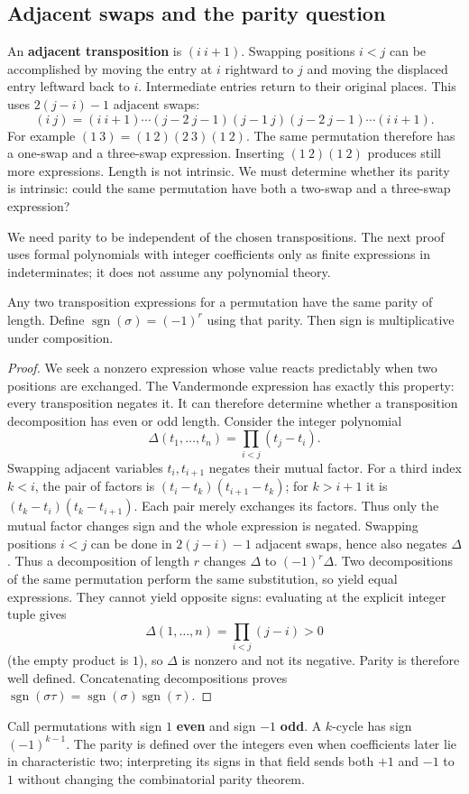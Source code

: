 \subsection{Adjacent swaps and the parity question}
An \textbf{adjacent transposition} is $(i\ i+1)$. Swapping positions
$i<j$ can be accomplished by moving the entry at $i$ rightward to $j$
and moving the displaced entry leftward back to $i$. Intermediate entries
return to their original places. This uses $2(j-i)-1$ adjacent swaps:
\[
(i\ j)=(i\ i+1)\cdots(j-2\ j-1)(j-1\ j)
(j-2\ j-1)\cdots(i\ i+1).
\]
For example $(1\ 3)=(1\ 2)(2\ 3)(1\ 2)$. The same permutation
therefore has a one-swap and a three-swap expression. Inserting
$(1\ 2)(1\ 2)$ produces still more expressions. Length is not intrinsic.
We must determine whether its parity is intrinsic: could the same
permutation have both a two-swap and a three-swap expression?

We need parity to be independent of the chosen transpositions. The next
proof uses formal polynomials with integer coefficients only as finite
expressions in indeterminates; it does not assume any polynomial theory.
\begin{theorem}
\label{thm:appendix-parity}
Any two transposition expressions for a permutation have the same parity
of length. Define $\operatorname{sgn}(\sigma)=(-1)^r$ using that parity.
Then sign is multiplicative under composition.
\end{theorem}
\begin{proof}
We seek a nonzero expression whose value reacts predictably when two
positions are exchanged. The Vandermonde expression has exactly this
property: every transposition negates it. It can therefore determine
whether a transposition decomposition has even or odd length. Consider
the integer polynomial
\[
\Delta(t_1,\ldots,t_n)=\prod_{i<j}(t_j-t_i).
\]
Swapping adjacent variables $t_i,t_{i+1}$ negates their mutual factor.
For a third index $k<i$, the pair of factors is
$(t_i-t_k)(t_{i+1}-t_k)$; for $k>i+1$ it is
$(t_k-t_i)(t_k-t_{i+1})$. Each pair merely exchanges its factors.
Thus only the mutual factor changes sign and the whole expression is negated. Swapping positions $i<j$ can be done in
$2(j-i)-1$ adjacent swaps, hence also negates $\Delta$.
Thus a decomposition of length $r$ changes $\Delta$ to $(-1)^r\Delta$.
Two decompositions of the same permutation perform the same substitution,
so yield equal expressions. They cannot yield opposite signs: evaluating
at the explicit integer tuple gives
\[
\Delta(1,\ldots,n)=\prod_{i<j}(j-i)>0
\]
(the empty product is $1$), so $\Delta$ is nonzero and not its negative.
Parity is therefore well defined. Concatenating decompositions proves
$\operatorname{sgn}(\sigma\tau)=\operatorname{sgn}(\sigma)
\operatorname{sgn}(\tau)$.
\end{proof}
Call permutations with sign $1$ \textbf{even} and sign $-1$ \textbf{odd}.
A $k$-cycle has sign $(-1)^{k-1}$.
The parity is defined over the integers even when coefficients later lie
in characteristic two; interpreting its signs in that field sends both
$+1$ and $-1$ to $1$ without changing the combinatorial parity theorem.

